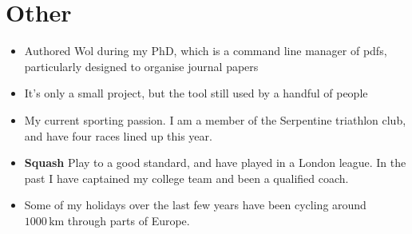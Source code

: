 \section{Other}

{
  \begin{itemize}
    \item Authored Wol during my PhD, which is a command line manager of pdfs,
      particularly designed to organise journal papers
    \item It's only a small project, but the tool still used by a handful of people
  \end{itemize}
}

\vspace{-1em}

{
  \begin{itemize}
    \item My current sporting passion.  I am a member of the Serpentine
      triathlon club, and have four races lined up this year.
  \end{itemize}
}
\vspace{-1em}
{
  \begin{itemize}
    \item \textbf{Squash} Play to a good standard, and have played in a London league.  In the past
      I have captained my college team and been a qualified coach.
  \end{itemize}
}
\vspace{-1em}
{
  \begin{itemize}
    \item Some of my holidays over the last few years have been cycling
      around $1000\,\textrm{km}$ through parts of Europe.
  \end{itemize}
}





